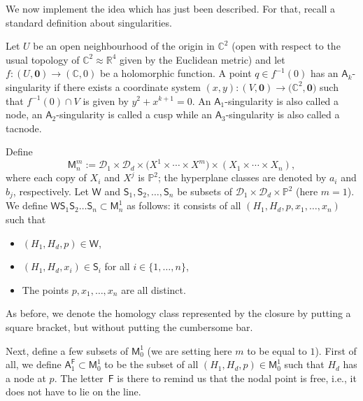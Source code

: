 \documentclass[pdftex]{sigma}
\numberwithin{equation}{section}
\begin{document}
We now implement the idea which has just been described.
For that, recall a standard definition about singularities.
\begin{defn}
\label{singularity_defn}
Let $U$ be an open neighbourhood of the origin in $\mathbb{C}^2$
(open with respect to the usual topology of $\mathbb{C}^2\approx \mathbb{R}^4$ given by the
Euclidean metric)
and let $f \colon (U, \mathbf{0}) \longrightarrow (\mathbb{C}, 0)$ be a holomorphic
function. A point $q \in f^{-1}(0)$ has
an $\mathsf{A}_k$-singularity if there exists a coordinate system
$(x, y) \colon (V, \mathbf{0}) \longrightarrow \bigl(\mathbb{C}^2, \mathbf{0}\bigr)$ such that $f^{-1}(0) \cap V$ is given by
$
y^2 + x^{k+1} = 0$. An $\mathsf{A}_1$-singularity is also called a \textsf{node}, an $\mathsf{A}_2$-singularity is
called a \textsf{cusp} while an $\mathsf{A}_3$-singularity is also called a \textsf{tacnode}.
\end{defn}
Define
\[
\mathsf{M}_{n}^m :=  \mathcal{D}_1 \times \mathcal{D}_d \times \bigl(X^1 \times \cdots \times X^m\bigr) \times (X_1\times \cdots\times X_n),
\]
where each copy of $X_i$ and $X^j$ is $\mathbb{P}^2$;
the hyperplane classes are denoted by $a_i$ and $b_j$, respectively. Let $\mathsf{W}$ and
$\mathsf{S}_1, \mathsf{S}_2, \dots, \mathsf{S}_n$ be subsets of
$\mathcal{D}_1 \times \mathcal{D}_d \times \mathbb{P}^2$ (here $m=1$). We define
$\mathsf{W}  \mathsf{S}_1 \mathsf{S}_2 \dots \mathsf{S}_n \subset \mathsf{M}_n^1$
as follows:
it consists of all
$(H_1, H_d, p, x_1,\dots, x_n)$ such that
\begin{itemize}\itemsep=0pt
\item $(H_1, H_d, p) \in \mathsf{W}$,
\item $(H_1, H_d, x_i) \in \mathsf{S}_i$ for all $i \in \{1, \dots, n\}$,
\item The points $p, x_1, \dots , x_n$ are all distinct.
\end{itemize}
As before, we denote the homology class represented by the closure
by putting a square bracket, but without putting the cumbersome bar.

Next, define a few subsets of $\mathsf{M}^1_0$ (we are setting here $m$ to be equal to $1$).
First of all, we define
$\mathsf{A}_1^{\mathsf{F}} \subset \mathsf{M}^1_0$ to be the subset of all
$(H_1, H_d, p) \in \mathsf{M}^1_0$ such that
$H_d$ has a node at $p$. The letter~$\mathsf{F}$ is there to remind us that the nodal
point is free, i.e., it does not have to lie on the line.
\end{document}
